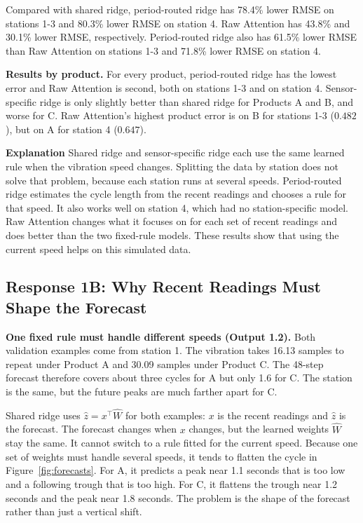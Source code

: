 \documentclass[11pt,a4paper]{article}
\begin{document}
Compared with shared ridge, period-routed ridge has 78.4\% lower RMSE on
stations 1-3 and 80.3\% lower RMSE on station 4. Raw Attention has 43.8\%
and 30.1\% lower RMSE, respectively. Period-routed ridge also has 61.5\% lower
RMSE than Raw Attention on stations 1-3 and 71.8\% lower RMSE on station 4.


\textbf{Results by product.}
For every product, period-routed ridge has the lowest error and Raw Attention
is second, both on stations 1-3 and on station 4. Sensor-specific ridge is
only slightly better than shared ridge for Products A and B, and worse for C.
Raw Attention's highest product error is on B for stations 1-3 ($0.482$), but
on A for station 4 ($0.647$).

\textbf{Explanation}
Shared ridge and sensor-specific ridge each use the same learned rule when the
vibration speed changes. Splitting the data by station does not solve that
problem, because each station runs at several speeds. Period-routed ridge
estimates the cycle length from the recent readings and chooses a rule for that
speed. It also works well on station 4, which had no station-specific model.
Raw Attention changes what it focuses on for each set of recent readings and
does better than the two fixed-rule models.
These results show that using the current speed helps on this simulated data.


\clearpage
\subsection*{Response 1B: Why Recent Readings Must Shape the Forecast}

\textbf{One fixed rule must handle different speeds (Output 1.2).}
Both validation examples come from station 1. The vibration takes 16.13
samples to repeat under Product A and 30.09 samples under Product C. The
48-step forecast therefore covers about three cycles for A but only 1.6 for
C. The station is the same, but the future peaks are much farther apart for C.

Shared ridge uses $\hat{z}=x^\top\widehat{W}$ for both examples: $x$ is the
recent readings and $\hat{z}$ is the forecast. The forecast changes when $x$
changes, but the learned weights $\widehat{W}$ stay
the same. It cannot switch to a rule fitted for the current speed. Because one
set of weights must handle several speeds, it tends to flatten the cycle in
Figure~\ref{fig:forecasts}. For A, it predicts a peak near 1.1 seconds that is
too low and a following trough that is too high. For C, it flattens the trough
near 1.2 seconds and the peak near 1.8 seconds. The problem is the shape of
the forecast rather than just a vertical shift.
\end{document}
